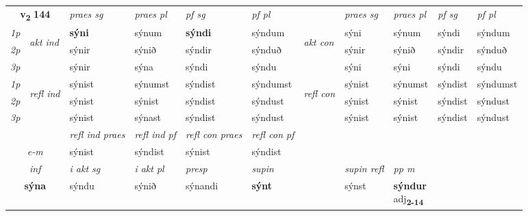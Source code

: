 \noindent
\begin{tabular}{lllllllllll} \toprule
\multicolumn{2}{c}{\textbf{v{\textsubscript{2}}} \Large{\textbf{144}}}  &  \textit{praes sg}  & \textit{praes pl}  &\textit{ pf sg} & \textit{pf pl} &  &  \textit{praes sg}  & \textit{praes pl}  & \textit{pf sg} & \textit{pf pl } \\*
	\cmidrule{3-6} \cmidrule{8-11}
 {\textit{1p}} & \multirow{3}{*}{\begin{turn}{90}\textit{akt ind}\end{turn}} & \textbf{sýni} & sýnum & \textbf{sýndi} & sýndum & \multirow{3}{*}{\begin{turn}{90}\textit{akt con}\end{turn}} &sýni & sýnum & sýndi & sýndum\\*
 {\textit{2p}} &  &  sýnir  & sýnið & sýndir & sýnduð & & sýnir & sýnið & sýndir & sýnduð \\*
{\textit{3p}} &  & sýnir & sýna & sýndi & sýndu & & sýni & sýni& sýndi & sýndu \\*
\cmidrule{3-6} \cmidrule{8-11}
 {\textit{1p}} & \multirow{3}{*}{\begin{turn}{90}\textit{refl ind}\end{turn}}  & sýnist & sýnumst & sýndist & sýndumst & \multirow{3}{*}{\begin{turn}{90}\textit{refl con}\end{turn}}  &sýnist & sýnumst & sýndist & sýndumst \\*
 {\textit{2p}} &  & sýnist & sýnist & sýndist & sýndust & &sýnist & sýnist & sýndist & sýndust \\*
 {\textit{3p}}  & & sýnist & sýnast & sýndist & sýndust & & sýnist & sýnist& sýndist & sýndust \\*
\cmidrule{3-6} \cmidrule{8-11}

 & & \textit{refl ind praes} & \textit{refl ind pf} & \textit{refl con praes} & \textit{refl con pf} \\*
 \multicolumn{2}{c}{ \textit{e-m} }& sýnist & sýndist & sýnist & sýndist \\*

\cmidrule{3-9}
   \multicolumn{2}{c}{\textit{inf}}  & \textit{i akt sg} & \textit{i akt pl}   & \textit{presp} & \textit{supin} && \textit{supin refl} & \textit{pp m} \\*
  \multicolumn{2}{c}{\textbf{sýna}} & sýndu  & sýnið   & sýnandi &  \textbf{sýnt} && sýnst & \specialcell{\textbf{sýndur} \\ adj\textbf{\textsubscript{2-14}}} \\*
\end{tabular}

